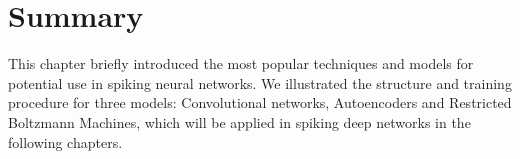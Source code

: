 \section{Summary}
This chapter briefly introduced the most popular \protect{} \protect{} techniques and models for potential use in spiking neural networks.
We illustrated the structure and training procedure for three \protect{} \protect{} models: Convolutional networks, Autoencoders and Restricted Boltzmann Machines, which will be applied in spiking deep networks in the following chapters.